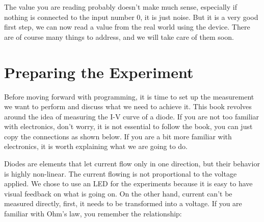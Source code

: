 The value you are reading probably doesn't make much sense, especially if nothing is connected to the input number 0, it is just noise. But it is a very good first step, we can now read a value from the real world using the device. There are of course many things to address, and we will take care of them soon.








\section{Preparing the Experiment}
Before moving forward with programming, it is time to set up the measurement we want to perform and discuss what we need to achieve it. This book revolves around the idea of measuring the I-V curve of a diode. If you are not too familiar with electronics, don't worry, it is not essential to follow the book, you can just copy the connections as shown below. If you are a bit more familiar with electronics, it is worth explaining what we are going to do.

Diodes are elements that let current flow only in one direction, but their behavior is highly non-linear. The current flowing is not proportional to the voltage applied. We chose to use an LED for the experiments because it is easy to have visual feedback on what is going on. On the other hand, current can't be measured directly, first, it needs to be transformed into a voltage. If you are familiar with Ohm's law, you remember the relationship:

